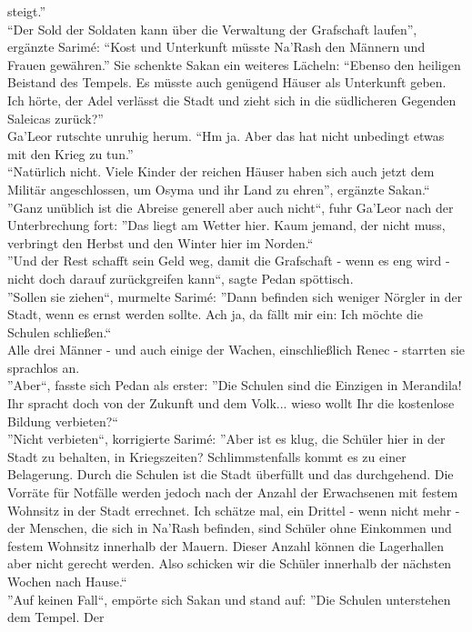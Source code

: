 steigt.''\\
``Der Sold der Soldaten kann über die Verwaltung der Grafschaft laufen'', ergänzte Sarimé: ``Kost 
und Unterkunft müsste Na'Rash den Männern und Frauen gewähren.'' Sie schenkte Sakan ein weiteres 
Lächeln: ``Ebenso den heiligen Beistand des Tempels. Es müsste auch genügend Häuser als Unterkunft 
geben. Ich hörte, der Adel verlässt die Stadt und zieht sich in die südlicheren Gegenden Saleicas 
zurück?''\\
Ga'Leor rutschte unruhig herum. ``Hm ja. Aber das hat nicht unbedingt etwas mit den Krieg zu 
tun.''\\
``Natürlich nicht. Viele Kinder der reichen Häuser haben sich auch jetzt dem Militär angeschlossen, 
um Osyma und ihr Land zu ehren'', ergänzte Sakan.``\\
''Ganz unüblich ist die Abreise generell aber auch nicht``, fuhr Ga'Leor nach der Unterbrechung 
fort: ''Das liegt am Wetter hier. Kaum jemand, der nicht muss, verbringt den Herbst und den Winter 
hier im Norden.``\\
''Und der Rest schafft sein Geld weg, damit die Grafschaft - wenn es eng wird - nicht doch darauf 
zurückgreifen kann``, sagte Pedan spöttisch.\\
''Sollen sie ziehen``, murmelte Sarimé: ''Dann befinden sich weniger Nörgler in der Stadt, wenn es 
ernst werden sollte. Ach ja, da fällt mir ein: Ich möchte die Schulen schließen.``\\
Alle drei Männer - und auch einige der Wachen, einschließlich Renec - starrten sie sprachlos an.\\
''Aber``, fasste sich Pedan als erster: ''Die Schulen sind die Einzigen in Merandila! Ihr spracht 
doch von der Zukunft und dem Volk... wieso wollt Ihr die kostenlose Bildung verbieten?``\\
''Nicht verbieten``, korrigierte Sarimé: ''Aber ist es klug, die Schüler hier in der Stadt zu 
behalten, in Kriegszeiten? Schlimmstenfalls kommt es zu einer Belagerung. Durch die Schulen ist die 
Stadt überfüllt und das durchgehend. Die Vorräte für Notfälle werden jedoch nach der Anzahl der 
Erwachsenen mit festem Wohnsitz in der Stadt errechnet. Ich schätze mal, ein Drittel - wenn nicht 
mehr - der Menschen, die sich in Na'Rash befinden, sind Schüler ohne Einkommen und festem Wohnsitz 
innerhalb der Mauern. Dieser Anzahl können die Lagerhallen aber nicht gerecht werden. Also schicken 
wir die Schüler innerhalb der nächsten Wochen nach Hause.``\\
''Auf keinen Fall``, empörte sich Sakan und stand auf: ''Die Schulen unterstehen dem Tempel. Der 
